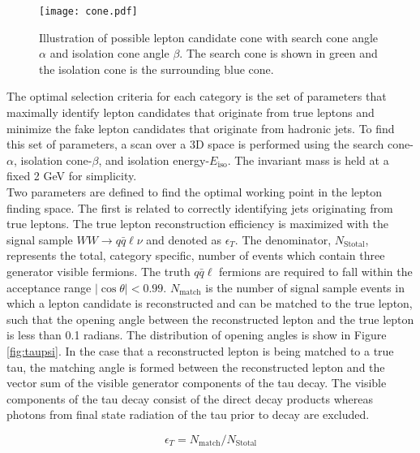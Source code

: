 \begin{figure}[hp]
\centering
\captionsetup{justification=raggedright,margin=3cm}
\texttt{[image: cone.pdf]}
\caption{Illustration of possible lepton candidate cone with search cone angle $\alpha$ and isolation cone angle $\beta$. The search cone is shown in green and the isolation cone is the surrounding blue cone.}
\end{figure}


 The optimal selection criteria for each category is the set of parameters that maximally identify lepton candidates that originate from true leptons and minimize the fake lepton candidates that originate from hadronic jets. To find this set of parameters, a scan over a 3D space is performed using the search cone-$\alpha$, isolation cone-$\beta$, and isolation energy-$E_{\text{iso}}$. The invariant mass is held at a fixed 2 GeV for simplicity.\\
Two parameters are defined to find the optimal working point in the lepton finding space. The first is related to correctly identifying jets originating from true leptons.
The true lepton reconstruction efficiency is maximized with the signal sample $WW\rightarrow q\bar{q}\ell\nu$ and denoted as  $\epsilon_T$. The denominator, $N_{\text{Stotal}}$, represents the total, category specific, number of events which contain three generator visible fermions. The truth $q\bar{q}\ell$ fermions are required to fall within the acceptance range $|\cos\theta| < 0.99$. $N_{\text{match}}$ is the number of signal sample events in which a lepton candidate is reconstructed and can be matched to the true lepton, such that the opening angle between the reconstructed lepton and the true lepton is less than 0.1 radians. The distribution of opening angles is show in Figure \ref{fig:taupsi}. In the case that a reconstructed lepton is being matched to a true tau, the matching angle is formed between the reconstructed lepton and the vector sum of the visible generator components of the tau decay. The visible components of the tau decay consist of the direct decay products whereas photons from final state radiation of the tau prior to decay are excluded.

\begin{equation}
\label{eq:et}
\epsilon_T = N_{\text{match}}/N_{\text{Stotal}}
\end{equation}

